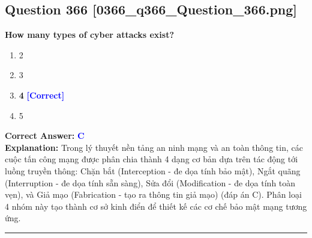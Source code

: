 \documentclass[11pt,a4paper]{article}
\begin{document}
\begin{minipage}{\textwidth}
\subsection*{Question 366 \quad \footnotesize{[0366\_q366\_Question\_366.png]}}
\noindent \textbf{How many types of cyber attacks exist?}

\begin{enumerate}[label=\Alph*.]
    \item 2
    \item 3
    \item \textbf{4} \hfill \textcolor{blue}{\textbf{[Correct]}}
    \item 5
\end{enumerate}

\noindent \textbf{Correct Answer:} \textcolor{blue}{\textbf{C}} \\[2pt]
\noindent \textbf{Explanation:} Trong lý thuyết nền tảng an ninh mạng và an toàn thông tin, các cuộc tấn công mạng được phân chia thành 4 dạng cơ bản dựa trên tác động tới luồng truyền thông: Chặn bắt (Interception - đe dọa tính bảo mật), Ngắt quãng (Interruption - đe dọa tính sẵn sàng), Sửa đổi (Modification - đe dọa tính toàn vẹn), và Giả mạo (Fabrication - tạo ra thông tin giả mạo) (đáp án C). Phân loại 4 nhóm này tạo thành cơ sở kinh điển để thiết kế các cơ chế bảo mật mạng tương ứng.

\par\vspace{0.3cm}
\hrule
\vspace{0.3cm}
\end{minipage}
\end{document}
